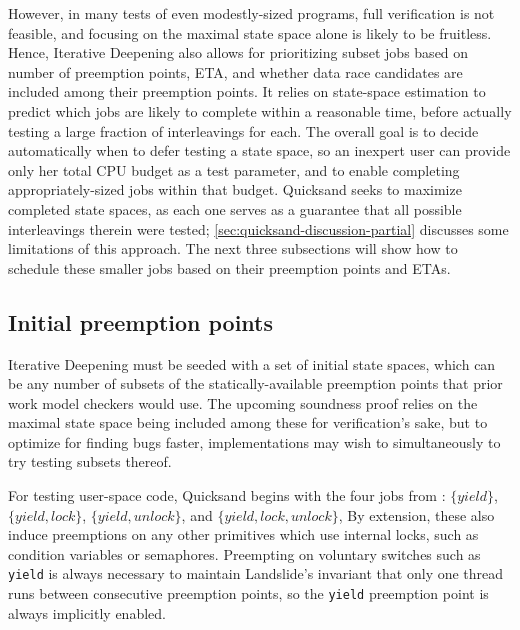 However, in many tests of even modestly-sized programs,
full verification is not feasible,
and focusing on the maximal state space alone is likely to be fruitless.
%
Hence, Iterative Deepening also allows for prioritizing subset jobs
based on number of preemption points, ETA, and whether data race candidates are included among their preemption points.
It relies on state-space estimation \cite{estimation}
to predict which jobs are likely to complete within a reasonable time,
before actually testing a large fraction of interleavings for each.
The overall goal is to decide automatically when to defer testing a state space,
so an inexpert user can provide only her total CPU budget as a test parameter,
and to enable completing appropriately-sized jobs within that budget.
Quicksand seeks to maximize completed state spaces,
as each one serves as a guarantee that all possible interleavings therein were tested;
\cref{sec:quicksand-discussion-partial} discusses some limitations of this approach.
The next three subsections will show how to schedule these smaller jobs
based on their preemption points and ETAs.


\subsection{Initial preemption points}
\label{sec:quicksand-initial-pps}

Iterative Deepening must be seeded with a set of initial state spaces,
which can be any number of subsets of the statically-available preemption points
that prior work model checkers would use.
The upcoming soundness proof relies on the maximal state space being included among these for verification's sake,
but to optimize for finding bugs faster,
implementations may wish to simultaneously to try testing subsets thereof.

For testing user-space code, Quicksand begins with the four
jobs from :
$\{yield\}$,
$\{yield,lock\}$,
$\{yield,unlock\}$,
and $\{yield,lock,unlock\}$,
By extension, these also induce preemptions on any other primitives
which use
internal locks,
such as condition variables or semaphores.
Preempting on voluntary switches such as {\tt yield} is always necessary to maintain
Landslide's invariant that only one thread runs between consecutive preemption points,
so the {\tt yield} preemption point is always implicitly enabled.

